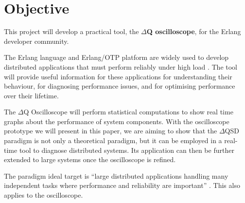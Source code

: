 \section{Objective}
         This project will develop a practical tool, the \textbf{$\Delta$Q oscilloscope}, for the Erlang developer community. 
    
    The Erlang language and Erlang/OTP platform are widely used to develop distributed applications that must perform reliably under high load \cite{erl}. The tool will provide useful information for these applications for understanding their behaviour, for diagnosing performance issues, and for optimising performance over their lifetime. \cite{post}

    The $\Delta$Q Oscilloscope will perform statistical computations to show real time graphs about the performance of system components. With the oscilloscope prototype we will present in this paper, we are aiming to show that the $\Delta$QSD paradigm is not only a theoretical paradigm, but it can be employed in a real-time tool to diagnose distributed systems. Its application can then be further extended to large systems once the oscilloscope is refined.


    The paradigm ideal target is ``large distributed applications handling many independent tasks where performance and reliability are important'' \cite{dq-tut}. This also applies to the oscilloscope.
    


